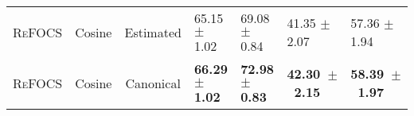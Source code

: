 \begin{table*}[!ht]
{\begin{tabular}{llcllll}
\textsc{ReFOCS} & Cosine  & Estimated   
& 65.15 $\pm$ 1.02	& 69.08 $\pm$ 0.84 & 41.35 $\pm$ 2.07	& 57.36 $\pm$ 1.94 \\
\textsc{ReFOCS} & Cosine   & Canonical                        & \textbf{66.29 $\pm$ 1.02}     & \textbf{72.98 $\pm$ 0.83}        & \textbf{42.30~$\pm$~2.15}     & \textbf{58.39~$\pm$~1.97}         \\ 
\bottomrule
\end{tabular}
}


\vspace{-0.5em}
\label{tab:logo}
\end{table*}